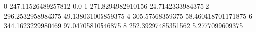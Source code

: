 0 247.11526489257812 0.0
1 271.8294982910156 24.7142333984375
2 296.2532958984375 49.138031005859375
4 305.57568359375 58.460418701171875
6 344.1623229980469 97.04705810546875
8 252.39297485351562 5.2777099609375
